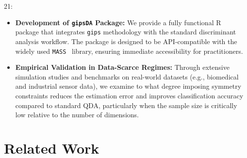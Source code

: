 \documentclass[a4paper,11pt,twoside]{report}
\theoremstyle{definition}
\begin{document}
21:

\begin{itemize}
    \item \textbf{Development of \texttt{gipsDA} Package:} We provide a fully functional R~\cite{rcore2025} package that integrates \texttt{gips} methodology with the standard discriminant analysis workflow. The package is designed to be API-compatible with the widely used \texttt{MASS}~\cite{venables2002} library, ensuring immediate accessibility for practitioners.


    \item \textbf{Empirical Validation in Data-Scarce Regimes:} Through extensive simulation studies and benchmarks on real-world datasets (e.g., biomedical and industrial sensor data), we examine to what degree imposing symmetry constraints reduces the estimation error and improves classification accuracy compared to standard QDA, particularly when the sample size is critically low relative to the number of dimensions.
\end{itemize}


\chapter{Related Work}
\end{document}
